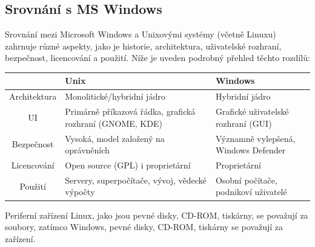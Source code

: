 \subsection{Srovnání s MS Windows}
Srovnání mezi Microsoft Windows a Unixovými systémy (včetně Linuxu) zahrnuje různé aspekty, jako je historie, architektura, uživatelské rozhraní, bezpečnost, licencování a použití. Níže je uveden podrobný přehled těchto rozdílů:
\begin{center}
\begin{tabular}{ |c| m{5cm}| m{4cm}| }
 \hline
 & Unix & Windows \\ 
 \hline
 Architektura & Monolitické/hybridní jádro & Hybridní jádro \\  
 \hline
 UI & Primárně příkazová řádka, grafická rozhraní (GNOME, KDE) & Grafické uživatelské rozhraní (GUI) \\  
 \hline
 Bezpečnost & Vysoká, model založený na oprávněních & Významně vylepšená, Windows Defender \\  
 \hline
 Licencování & Open source (GPL) i proprietární & Proprietární \\  
 \hline
 Použití & Servery, superpočítače, vývoj, vědecké výpočty & Osobní počítače, podnikoví uživatelé \\
 \hline
\end{tabular}
\end{center}
Periferní zařízení Linux, jako jsou pevné disky, CD-ROM, tiskárny, se považují za soubory, zatímco
Windows, pevné disky, CD-ROM, tiskárny se považují za zařízení. 

